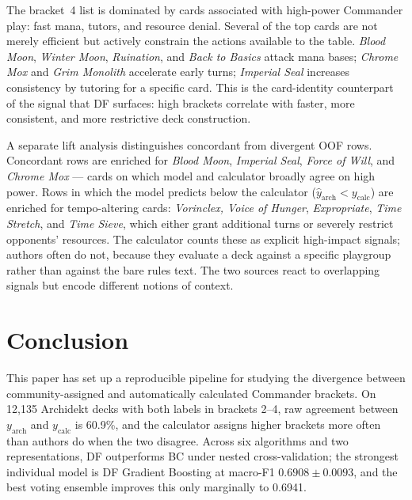 \documentclass{article}
\begin{document}
The bracket~4 list is dominated by cards associated with high-power Commander play: fast mana, tutors, and resource denial. Several of the top cards are not merely efficient but actively constrain the actions available to the table. \textit{Blood Moon}, \textit{Winter Moon}, \textit{Ruination}, and \textit{Back to Basics} attack mana bases; \textit{Chrome Mox} and \textit{Grim Monolith} accelerate early turns; \textit{Imperial Seal} increases consistency by tutoring for a specific card. This is the card-identity counterpart of the signal that DF surfaces: high brackets correlate with faster, more consistent, and more restrictive deck construction.

A separate lift analysis distinguishes concordant from divergent OOF rows. Concordant rows are enriched for \textit{Blood Moon}, \textit{Imperial Seal}, \textit{Force of Will}, and \textit{Chrome Mox} --- cards on which model and calculator broadly agree on high power. Rows in which the model predicts below the calculator (\(\hat{y}_{\text{arch}} < y_{\text{calc}}\)) are enriched for tempo-altering cards: \textit{Vorinclex, Voice of Hunger}, \textit{Expropriate}, \textit{Time Stretch}, and \textit{Time Sieve}, which either grant additional turns or severely restrict opponents' resources. The calculator counts these as explicit high-impact signals; authors often do not, because they evaluate a deck against a specific playgroup rather than against the bare rules text. The two sources react to overlapping signals but encode different notions of context.
\section{Conclusion}
\label{sec:conclusion}

This paper has set up a reproducible pipeline for studying the divergence between community-assigned and automatically calculated Commander brackets. On 12{,}135 Archidekt decks with both labels in brackets 2--4, raw agreement between \(y_{\text{arch}}\) and \(y_{\text{calc}}\) is 60.9\%, and the calculator assigns higher brackets more often than authors do when the two disagree. Across six algorithms and two representations, DF outperforms BC under nested cross-validation; the strongest individual model is DF Gradient Boosting at macro-F1 \(0.6908 \pm 0.0093\), and the best voting ensemble improves this only marginally to 0.6941.
\end{document}
